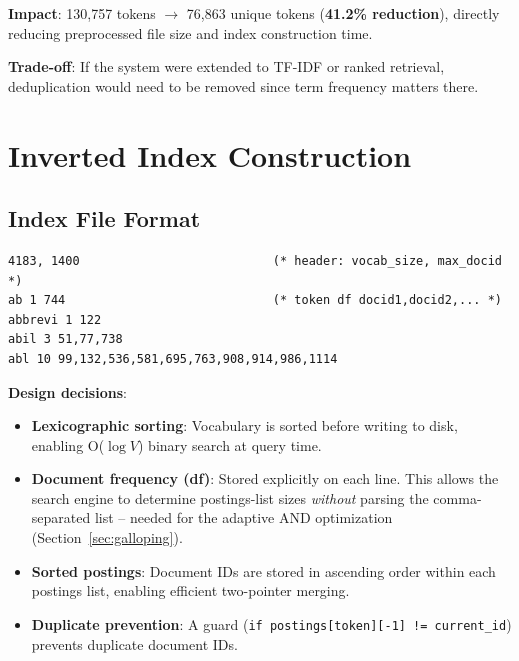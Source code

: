 \documentclass[12pt,a4paper]{article}
\begin{document}
\textbf{Impact}: 130,757 tokens $\to$ 76,863 unique tokens
(\textbf{41.2\% reduction}), directly reducing preprocessed file size and
index construction time.

\textbf{Trade-off}: If the system were extended to TF-IDF or ranked retrieval,
deduplication would need to be removed since term frequency matters there.

\section{Inverted Index Construction}
\label{sec:indexing}

\subsection{Index File Format}

\begin{lstlisting}[style=outputstyle,numbers=none]
4183, 1400                           (* header: vocab_size, max_docid *)
ab 1 744                             (* token df docid1,docid2,... *)
abbrevi 1 122
abil 3 51,77,738
abl 10 99,132,536,581,695,763,908,914,986,1114
\end{lstlisting}

\textbf{Design decisions}:
\begin{itemize}[noitemsep]
  \item \textbf{Lexicographic sorting}: Vocabulary is sorted before writing to
        disk, enabling O($\log V$) binary search at query time.
  \item \textbf{Document frequency (df)}: Stored explicitly on each line.
        This allows the search engine to determine postings-list sizes
        \textit{without} parsing the comma-separated list -- needed for the
        adaptive AND optimization (Section~\ref{sec:galloping}).
  \item \textbf{Sorted postings}: Document IDs are stored in ascending order
        within each postings list, enabling efficient two-pointer merging.
  \item \textbf{Duplicate prevention}: A guard
        (\texttt{if postings[token][-1] != current\_id}) prevents duplicate
        document IDs.
\end{itemize}

\end{document}
